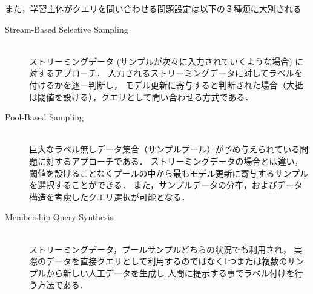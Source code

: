 また，学習主体がクエリを問い合わせる問題設定は以下の３種類に大別される
\begin{description}
    \item[Stream-Based Selective Sampling]\mbox{}\\
        ストリーミングデータ (サンプルが次々に入力されていくような場合) に対するアプローチ．
        入力されるストリーミングデータに対してラベルを付けるかを逐一判断し，
        モデル更新に寄与すると判断された場合（大抵は閾値を設ける），クエリとして問い合わせる方式である．
    \item[Pool-Based Sampling]\mbox{}\\
        巨大なラベル無しデータ集合（サンプルプール）が予め与えられている問題に対するアプローチである．
        ストリーミングデータの場合とは違い，閾値を設けることなくプールの中から最もモデル更新に寄与するサンプルを選択することができる．
        また，サンプルデータの分布，およびデータ構造を考慮したクエリ選択が可能となる．
    \item[Membership Query Synthesis]\mbox{}\\ 
        ストリーミングデータ，プールサンプルどちらの状況でも利用され，
        実際のデータを直接クエリとして利用するのではなく1つまたは複数のサンプルから新しい人工データを生成し
        人間に提示する事でラベル付けを行う方法である．
\end{description}

